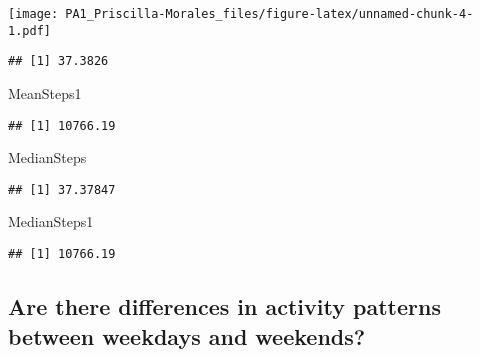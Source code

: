 \documentclass[
]{article}
\newenvironment{Shaded}{\begin{snugshade}}{\end{snugshade}}
\newcommand{\CommentTok}[1]{\textcolor[rgb]{0.56,0.35,0.01}{\textit{#1}}}
\newcommand{\DecValTok}[1]{\textcolor[rgb]{0.00,0.00,0.81}{#1}}
\newcommand{\KeywordTok}[1]{\textcolor[rgb]{0.13,0.29,0.53}{\textbf{#1}}}
\newcommand{\NormalTok}[1]{#1}
\newcommand{\OperatorTok}[1]{\textcolor[rgb]{0.81,0.36,0.00}{\textbf{#1}}}
\newcommand{\StringTok}[1]{\textcolor[rgb]{0.31,0.60,0.02}{#1}}
\begin{document}
\texttt{[image: PA1\_Priscilla-Morales\_files/figure-latex/unnamed-chunk-4-1.pdf]}

\begin{Shaded}
\end{Shaded}

\begin{verbatim}
## [1] 37.3826
\end{verbatim}

\begin{Shaded}
\begin{Highlighting}[]
\NormalTok{MeanSteps1}
\end{Highlighting}
\end{Shaded}

\begin{verbatim}
## [1] 10766.19
\end{verbatim}

\begin{Shaded}
\begin{Highlighting}[]
\NormalTok{MedianSteps}
\end{Highlighting}
\end{Shaded}

\begin{verbatim}
## [1] 37.37847
\end{verbatim}

\begin{Shaded}
\begin{Highlighting}[]
\NormalTok{MedianSteps1}
\end{Highlighting}
\end{Shaded}

\begin{verbatim}
## [1] 10766.19
\end{verbatim}

\hypertarget{are-there-differences-in-activity-patterns-between-weekdays-and-weekends}{%
\subsection{Are there differences in activity patterns between weekdays
and
weekends?}\label{are-there-differences-in-activity-patterns-between-weekdays-and-weekends}}
\end{document}
